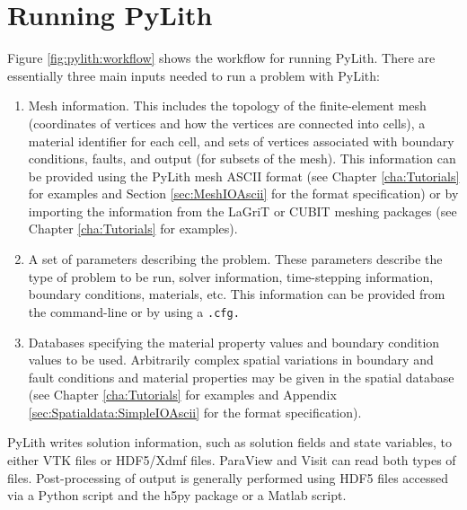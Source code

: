 
\chapter{Running PyLith}

Figure \ref{fig:pylith:workflow} shows the workflow for running PyLith.
There are essentially three main inputs needed to run a problem with
PyLith:
\begin{enumerate}
\item Mesh information. This includes the topology of the finite-element
mesh (coordinates of vertices and how the vertices are connected into
cells), a material identifier for each cell, and sets of vertices
associated with boundary conditions, faults, and output (for subsets
of the mesh). This information can be provided using the PyLith mesh
ASCII format (see Chapter \ref{cha:Tutorials} for examples and Section
\ref{sec:MeshIOAscii} for the format specification) or by importing
the information from the LaGriT or CUBIT meshing packages (see Chapter
\ref{cha:Tutorials} for examples).
\item A set of parameters describing the problem. These parameters describe
the type of problem to be run, solver information, time-stepping information,
boundary conditions, materials, etc. This information can be provided
from the command-line or by using a \texttt{.cfg.}
\item Databases specifying the material property values and boundary condition
values to be used. Arbitrarily complex spatial variations in boundary
and fault conditions and material properties may be given in the spatial
database (see Chapter \ref{cha:Tutorials} for examples and Appendix
\ref{sec:Spatialdata:SimpleIOAscii} for the format specification).
\end{enumerate}
PyLith writes solution information, such as solution fields and state
variables, to either VTK files or HDF5/Xdmf files. ParaView and Visit
can read both types of files. Post-processing of output is generally
performed using HDF5 files accessed via a Python script and the h5py
package or a Matlab script.

